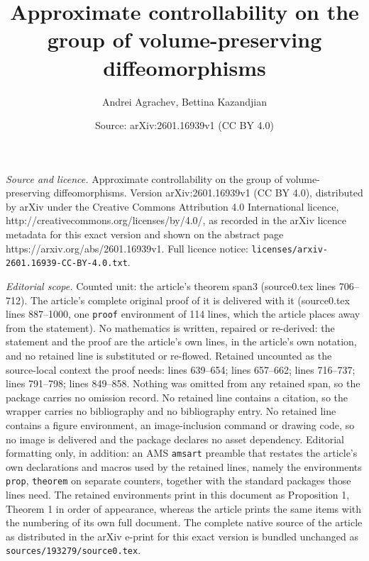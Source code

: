\documentclass[10pt,a4paper]{amsart}
\title{Approximate controllability on the group of volume-preserving diffeomorphisms}
\author{Andrei Agrachev, Bettina Kazandjian}
\date{Source: arXiv:2601.16939v1 (CC BY 4.0)}
\begin{document}
\maketitle

\noindent\emph{Source and licence.} Approximate controllability on the group of volume-preserving diffeomorphisms. Version arXiv:2601.16939v1 (CC BY 4.0), distributed by arXiv under the Creative Commons Attribution 4.0 International licence, http://creativecommons.org/licenses/by/4.0/, as recorded in the arXiv licence metadata for this exact version and shown on the abstract page https://arxiv.org/abs/2601.16939v1. Full licence notice: \texttt{licenses/arxiv-2601.16939-CC-BY-4.0.txt}.\par\smallskip

\noindent\textit{Editorial scope.} Counted unit: the article's theorem span3 (source0.tex lines 706--712). The article's complete original proof of it is delivered with it (source0.tex lines 887--1000, one \texttt{proof} environment of 114 lines, which the article places away from the statement). No mathematics is written, repaired or re-derived: the statement and the proof are the article's own lines, in the article's own notation, and no retained line is substituted or re-flowed.  Retained uncounted as the source-local context the proof needs: lines 639--654; lines 657--662; lines 716--737; lines 791--798; lines 849--858.  Nothing was omitted from any retained span, so the package carries no omission record.  No retained line contains a citation, so the wrapper carries no bibliography and no bibliography entry.  No retained line contains a figure environment, an image-inclusion command or drawing code, so no image is delivered and the package declares no asset dependency.  Editorial formatting only, in addition: an AMS \texttt{amsart} preamble that restates the article's own declarations and macros used by the retained lines, namely the environments \texttt{prop}, \texttt{theorem} on separate counters, together with the standard packages those lines need.  The retained environments print in this document as Proposition 1, Theorem 1 in order of appearance, whereas the article prints the same items with the numbering of its own full document.  The complete native source of the article as distributed in the arXiv e-print for this exact version is bundled unchanged as \texttt{sources/193279/source0.tex}.
\end{document}
